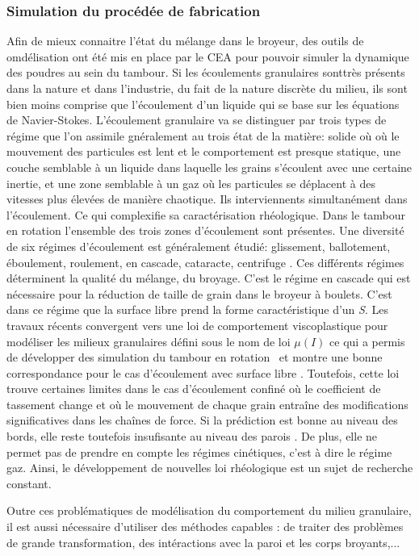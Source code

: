 \subsubsection*{Simulation du procédée de fabrication}

Afin de mieux connaitre l'état du mélange dans le broyeur, des outils de omdélisation ont été mis en place par le CEA pour pouvoir simuler la dynamique des poudres au sein du tambour. Si les écoulements granulaires sonttrès présents dans la nature et dans l'industrie, du fait de la nature discrète du milieu, ils sont bien moins comprise que l'écoulement d'un liquide qui se base sur les équations de Navier-Stokes.
L'écoulement granulaire va se distinguer par trois types de régime que l'on assimile gnéralement au trois état de la matière: solide où où le mouvement des particules est lent et le comportement est presque statique, une couche semblable à un liquide dans laquelle les grains s'écoulent avec une certaine inertie, et une zone semblable à un gaz où les particules se déplacent à des vitesses plus élevées de manière chaotique. Ils interviennents simultanément dans l'écoulement. Ce qui complexifie sa caractérisation rhéologique.
Dans le tambour en rotation l'ensemble des trois zones d'écoulement sont présentes. Une diversité de six régimes d'écoulement est généralement étudié: glissement, ballotement, éboulement, roulement, en cascade, cataracte,  centrifuge \cite{MELLMANN2001251}.
Ces différents régimes déterminent la qualité du mélange, du broyage.
C'est le régime en cascade qui est nécessaire pour la réduction de taille de grain dans le broyeur à boulets. C'est dans ce régime que la surface libre prend la forme caractéristique d'un \textit{S}.
Les travaux récents convergent vers une loi de comportement viscoplastique pour modéliser les milieux granulaires défini sous le nom de loi $\mu(I)$ \cite{gdr_midi_dense_2004,jop_constitutive_2006} ce qui a permis de développer des simulation du tambour en rotation~\cite{Cortet_2009} et montre une bonne correspondance pour le cas d'écoulement avec surface libre \cite{chou_cross-sectional_2009}.
Toutefois, cette loi trouve certaines limites dans le cas d'écoulement confiné où le coefficient de tassement change et où le mouvement de chaque grain entraîne des modifications significatives dans les chaînes de force. Si la prédiction est bonne au niveau des bords, elle reste toutefois insufisante au niveau des parois \cite{Rognon_Miller_Metzger_Einav_2015}. De plus, elle ne permet pas de prendre en compte les régimes cinétiques, c'est à dire le régime gaz. Ainsi, le développement de nouvelles loi rhéologique est un sujet de recherche constant.

Outre ces problématiques de modélisation du comportement du milieu granulaire, il est aussi nécessaire d'utiliser des méthodes capables : de traiter des problèmes de grande transformation, des intéractions avec la paroi et les corps broyants,...



